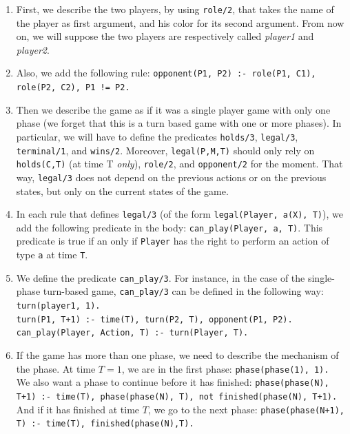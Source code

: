 \begin{enumerate}

\item First, we describe the two players, by using \texttt{role/2}, that takes the name of the player as first argument, and his color for its second argument. From now on, we will suppose the two players are respectively called \textit{player1} and \textit{player2}.  

\item Also, we add the following rule: \newline
\texttt{opponent(P1, P2) :- role(P1, C1), role(P2, C2), P1 != P2.}

\item Then we describe the game as if it was a single player game with only one phase \citep{thielscher2009answer} (we forget that this is a turn based game with one or more phases). In particular, we will have to define the predicates \texttt{holds/3}, \texttt{legal/3}, \texttt{terminal/1}, and \texttt{wins/2}. Moreover,  \texttt{legal(P,M,T)} should only rely on \texttt{holds(C,T)} (at time T \textit{only}), \texttt{role/2}, and \texttt{opponent/2} for the moment. That way, \texttt{legal/3} does not depend on the previous actions or on the previous states, but only on the current states of the game.

\item In each rule that defines \texttt{legal/3} (of the form \texttt{legal(Player, a(X), T)}), we add the following predicate in the body: \texttt{can\_play(Player, a, T)}. This predicate is true if an only if \texttt{Player} has the right to perform an action of type \texttt{a} at time \texttt{T}. 

\item We define the predicate \texttt{can\_play/3}. For instance, in the case of the single-phase turn-based game, \texttt{can\_play/3} can be defined in the following way:\newline
\texttt{turn(player1, 1). }\\
\texttt{turn(P1, T+1) :- time(T), turn(P2, T), opponent(P1, P2).}\\
\texttt{can\_play(Player, Action, T) :- turn(Player, T).}


\item If the game has more than one phase, we need to describe the mechanism of the phase. At time $T=1$, we are in the first phase:\newline
\texttt{phase(phase(1), 1).}\\
We also want a phase to continue before it has finished:\newline
\texttt{phase(phase(N), T+1) :- time(T), phase(phase(N), T), not finished(phase(N), T+1).}\\
And if it has finished at time $T$, we go to the next phase:\newline
\texttt{phase(phase(N+1), T) :- time(T), finished(phase(N),T).}


\end{enumerate}
